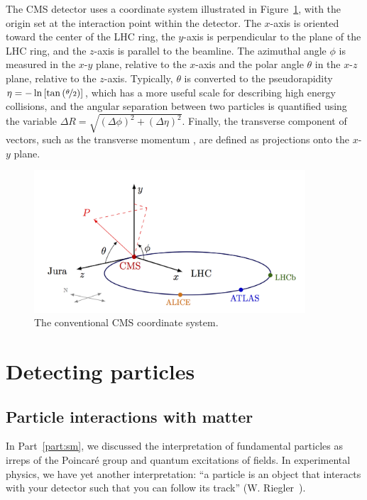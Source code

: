 The CMS detector uses a coordinate system illustrated in Figure~\ref{fig:02_cms_coords}, with the origin set at the interaction point within the detector.
The $x$-axis is oriented toward the center of the LHC ring, the $y$-axis is perpendicular to the plane of the LHC ring, and the $z$-axis is parallel to the beamline.
The azimuthal angle $\phi$ is measured in the $x$-$y$ plane, relative to the $x$-axis and the polar angle $\theta$ in the $x$-$z$ plane, relative to the $z$-axis.
Typically, $\theta$ is converted to the pseudorapidity $\eta = -\ln \left[ \tan \left( \cnicefrac{\theta}{2} \right) \right]$, which has a more useful scale for describing high energy collisions, and the angular separation between two particles is quantified using the variable $\Delta R = \sqrt{ (\Delta \phi)^2 + (\Delta \eta)^2 }$.
Finally, the transverse component of vectors, such as the transverse momentum \pt, are defined as projections onto the $x$-$y$ plane.

\begin{figure}[ht]
    \centering
    \captionsetup{justification=centering}
    \includegraphics[width=0.9\textwidth]{figures/02-CMS/cms/coordinate.png}
    \caption{The conventional CMS coordinate system.}
    \label{fig:02_cms_coords}
\end{figure}

\section{Detecting particles}
\label{sec:02_cms_particles}

\subsection{Particle interactions with matter}
\label{sec:02_cms_interactions}

In Part~\ref{part:sm}, we discussed the interpretation of fundamental particles as irreps of the Poincar\'e group and quantum excitations of fields.
In experimental physics, we have yet another interpretation: ``a particle is an object that interacts with your detector such that you can follow its track'' (W. Riegler~\cite{Riegler2013}).

